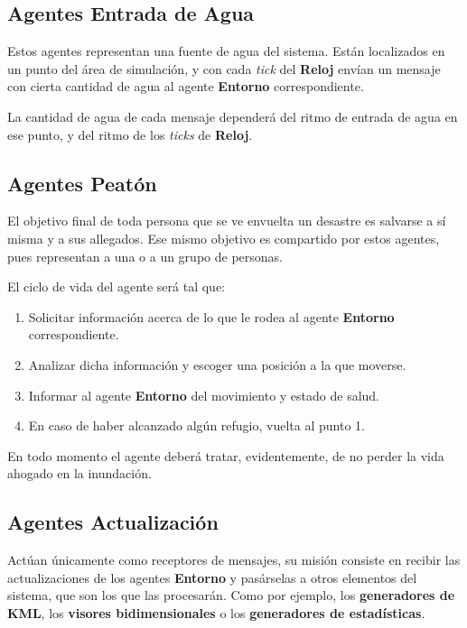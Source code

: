 \subsection*{Agentes Entrada de Agua}

Estos agentes representan una fuente de agua del sistema. Están localizados en
un punto del área de simulación, y con cada {\em tick} del {\bf Reloj} envían
un mensaje con cierta cantidad de agua al agente {\bf Entorno} correspondiente.

La cantidad de agua de cada mensaje dependerá del ritmo de entrada de agua en
ese punto, y del ritmo de los {\em ticks} de {\bf Reloj}.

\subsection*{Agentes Peatón}

El objetivo final de toda persona que se ve envuelta un desastre es salvarse a
sí misma y a sus allegados. Ese mismo objetivo es compartido por estos agentes,
pues representan a una o a un grupo de personas.

El ciclo de vida del agente será tal que:

\begin{enumerate}
 \item Solicitar información acerca de lo que le rodea al agente {\bf
Entorno} correspondiente.
 \item Analizar dicha información y escoger una posición a la que moverse.
 \item Informar al agente {\bf Entorno} del movimiento y estado de salud.
 \item En caso de haber alcanzado algún refugio, vuelta al punto 1.
\end{enumerate}

En todo momento el agente deberá tratar, evidentemente, de no perder la vida
ahogado en la inundación.

\subsection*{Agentes Actualización}

Actúan únicamente como receptores de mensajes, su misión consiste en recibir
las actualizaciones de los agentes {\bf Entorno} y pasárselas a otros elementos
del sistema, que son los que las procesarán. Como por ejemplo, los {\bf
generadores de KML}, los {\bf visores bidimensionales} o los {\bf generadores de
estadísticas}.

